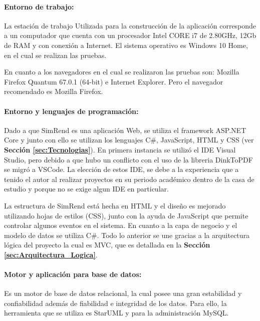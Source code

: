 \paragraph{Entorno de trabajo: } La estación de trabajo Utilizada para la construcción de la aplicación corresponde a un computador que cuenta con un procesador Intel CORE i7 de 2.80GHz, 12Gb de RAM y con conexión a Internet. El sistema operativo es Windows 10 Home, en el cual se realizan las pruebas.

En cuanto a los navegadores en el cual se realizaron las pruebas son: Mozilla Firefox Quantum 67.0.1 (64-bit) e Internet Explorer. Pero el navegador recomendado es Mozilla Firefox.

\paragraph{Entorno y lenguajes de programación: } Dado a que SimRend es una aplicación Web, se utiliza el framework ASP.NET Core y junto con ello se utilizan los lenguajes C\#, JavaScript, HTML y CSS (ver \textbf{Sección \ref{sec:Tecnologias}}). En primera instancia se utilizó el IDE Visual Studio, pero debido a que hubo un conflicto con el uso de la libreria DinkToPDF se migró a VSCode. La elección de estos IDE, se debe a la experiencia que a tenido el autor al realizar proyectos en su periodo académico dentro de la casa de estudio y porque no se exige algun IDE en particular.

La estructura de SimRend está hecha en HTML y el diseño es mejorado utilizando hojas de estilos (CSS), junto con la ayuda de JavaScript que permite controlar algunos eventos en el sistema. En cuanto a la capa de negocio y el modelo de datos se utiliza C\#. Todo lo anterior se une gracias a la arquitectura lógica del proyecto la cual es MVC, que es detallada en la \textbf{Sección \ref{sec:Arquitectura_Logica}}.

\paragraph{Motor y aplicación para base de datos: } Es un motor de base de datos relacional, la cual posee una gran estabilidad y confiabilidad además de fiabilidad e integridad de los datos. Para ello, la herramienta que se utiliza es StarUML y para la administración MySQL.



